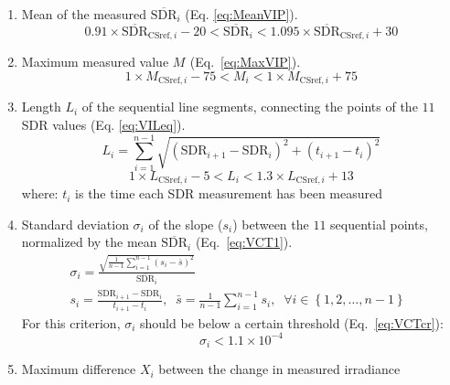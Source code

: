 \documentclass[applsci,article,submit,moreauthors,pdftex]{Definitions/mdpi}
\providecommand{\tightlist}{%
  \setlength{\itemsep}{0pt}\setlength{\parskip}{0pt}}
\begin{document}
\begin{enumerate}
\def\labelenumi{\alph{enumi})}
\tightlist
\item
  Mean of the measured \(\overline{\text{SDR}}_i\) (Eq.
  \ref{eq:MeanVIP}). \begin{equation}
  0.91 \times \overline{\text{SDR}}_{\text{CSref},i} - 20
  < \overline{\text{SDR}}_i <
  1.095 \times \overline{\text{SDR}}_{\text{CSref},i} + 30
  \label{eq:MeanVIP}
  \end{equation}
\item
  Maximum measured value \(M_{\text{}}\) (Eq.~\ref{eq:MaxVIP}).
  \begin{equation}
  1 \times M_{\text{CSref},i} - 75
  < M_{\text{}i} <
  1 \times M_{\text{CSref},i} + 75
  \label{eq:MaxVIP}
  \end{equation}
\item
  Length \(L_i\) of the sequential line segments, connecting the points
  of the \(11\) SDR values (Eq. \ref{eq:VILeq}). \begin{equation}
  L_i = \sum_{i=1}^{n-1}\sqrt{\left ( \text{SDR}_{i+1} - \text{SDR}_{i}\right )^2 + \left ( t_{i+1} - t_i \right )^2}
  \label{eq:VILeq}
  \end{equation} \begin{equation}
  1 \times L_{\text{CSref},i} - 5 < L_i < 1.3 \times L_{\text{CSref},i} + 13
  \label{eq:VILcr}
  \end{equation} where: \(t_i\) is the time each SDR measurement has
  been measured
\item
  Standard deviation \(\sigma_i\) of the slope (\(s_i\)) between the
  \(11\) sequential points, normalized by the mean
  \(\overline{\text{SDR}}_i\) (Eq.~\ref{eq:VCT1}). \begin{gather}
    \sigma_i = \frac {\sqrt{\frac{1}{n-1} \sum_{i=1}^{n-1} \left( s_i - \bar{s} \right)^2}} {\overline{\text{SDR}}_i} \label{eq:VCT1} \\
    s_i = \frac{\text{SDR}_{i+1} - \text{SDR}_{i}}{t_{i+1} - t_i},\;\;   \bar{s} = \frac{1}{n-1} \sum_{i=1}^{n-1} s_i,\;\;\forall i \in \left \{ 1, 2, \ldots, n-1 \right \}\;\;
  \end{gather} For this criterion, \(\sigma_i\) should be below a
  certain threshold (Eq.~\ref{eq:VCTcr}): \begin{equation}
    \sigma_i < \ensuremath{1.1\times 10^{-4}} \label{eq:VCTcr}
  \end{equation}
\item
  Maximum difference \(X_i\) between the change in measured irradiance

\end{enumerate}
\end{document}
